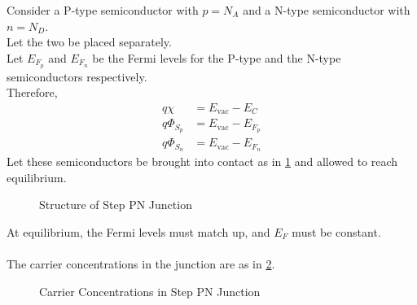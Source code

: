 \documentclass[titlepage, fleqn, a4paper, 12pt, twoside]{article}
\theoremstyle{definition}
\theoremstyle{theorem}
\begin{document}
Consider a P-type semiconductor with $p = N_A$ and a N-type semiconductor with $n = N_D$.\\
Let the two be placed separately.\\
Let $E_{F_p}$ and $E_{F_n}$ be the Fermi levels for the P-type and the N-type semiconductors respectively.\\
Therefore,
\begin{align*}
	q \chi       & = E_{\text{vac}} - E_C     \\
	q \Phi_{S_p} & = E_{\text{vac}} - E_{F_p} \\
	q \Phi_{S_n} & = E_{\text{vac}} - E_{F_n}
\end{align*}
Let these semiconductors be brought into contact as in \cref{fig:Structure_of_Step_PN_Junction} and allowed to reach equilibrium.
\begin{figure}[h]
	\centering
	\caption{Structure of Step PN Junction}
	\label{fig:Structure_of_Step_PN_Junction}
\end{figure}
At equilibrium, the Fermi levels must match up, and $E_F$ must be constant.\\
~\\
The carrier concentrations in the junction are as in \cref{fig:Carrier_Concentrations_in_Step_PN_Junction}.
\begin{figure}[h]
	\centering
	\caption{Carrier Concentrations in Step PN Junction}
	\label{fig:Carrier_Concentrations_in_Step_PN_Junction}
\end{figure}
\end{document}

